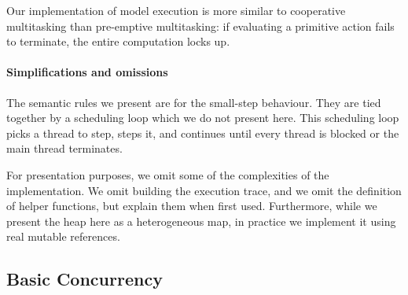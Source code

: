 Our implementation of model execution is more similar to cooperative
multitasking than pre-emptive multitasking: if evaluating a primitive
action fails to terminate, the entire computation locks up.

\paragraph{Simplifications and omissions}
The semantic rules we present are for the small-step behaviour.  They
are tied together by a scheduling loop which we do not present here.
This scheduling loop picks a thread to step, steps it, and continues
until every thread is blocked or the main thread terminates.

For presentation purposes, we omit some of the complexities of the
implementation.  We omit building the execution trace, and we omit the
definition of helper functions, but explain them when first used.
Furthermore, while we present the heap here as a heterogeneous map, in
practice we implement it using real mutable references.

\newcommand{\semfullthread}[3]{\langle\texttt{#1}, \texttt{#2}, \texttt{#3}\rangle}
\newcommand{\semthread}[1]{\semfullthread{#1}{E}{M}}

\newcommand{\semlfullrule}[4]{\langle\texttt{C}_{#1}, \texttt{B}_{#2}, \texttt{H}_{#3}, \texttt{T}_{\left[\texttt{tid} \mapsto \semthread{#4}\right]}\rangle}
\newcommand{\semlheaprule}[2]{\semlfullrule{}{}{[\texttt{id} \mapsto \texttt{#2}]}{#1}}
\newcommand{\semlrule}[1]{\semlfullrule{}{}{}{#1}}

\subsection{Basic Concurrency}

